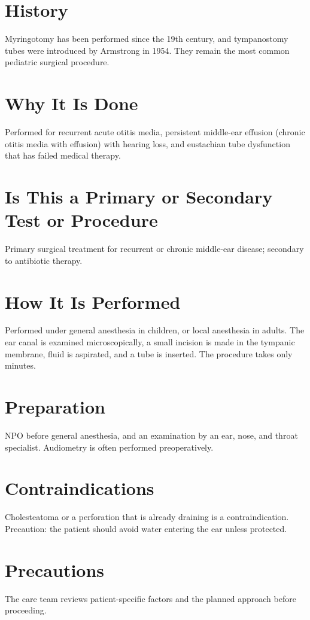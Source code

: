 \section*{History}
Myringotomy has been performed since the 19th century, and tympanostomy tubes were introduced by Armstrong in 1954. They remain the most common pediatric surgical procedure.

\section*{Why It Is Done}
Performed for recurrent acute otitis media, persistent middle-ear effusion (chronic otitis media with effusion) with hearing loss, and eustachian tube dysfunction that has failed medical therapy.

\section*{Is This a Primary or Secondary Test or Procedure}
Primary surgical treatment for recurrent or chronic middle-ear disease; secondary to antibiotic therapy.

\section*{How It Is Performed}
Performed under general anesthesia in children, or local anesthesia in adults. The ear canal is examined microscopically, a small incision is made in the tympanic membrane, fluid is aspirated, and a tube is inserted. The procedure takes only minutes.

\section*{Preparation}
NPO before general anesthesia, and an examination by an ear, nose, and throat specialist. Audiometry is often performed preoperatively.

\section*{Contraindications}
Cholesteatoma or a perforation that is already draining is a contraindication. Precaution: the patient should avoid water entering the ear unless protected.

\section*{Precautions}
The care team reviews patient-specific factors and the planned approach before proceeding.

